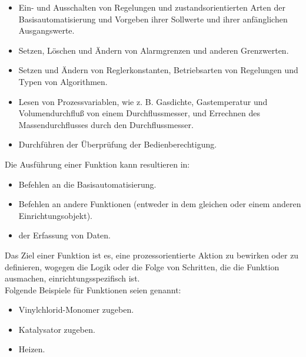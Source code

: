 \begin{itemize}
	\item Ein- und Ausschalten von Regelungen und zustandsorientierten Arten der Basisautomatisierung und Vorgeben ihrer Sollwerte und ihrer anfänglichen Ausgangswerte.
	\item Setzen, Löschen und Ändern von Alarmgrenzen und anderen Grenzwerten.
	\item Setzen und Ändern von Reglerkonstanten, Betriebsarten von Regelungen und Typen von Algorithmen.
	\item Lesen von Prozessvariablen, wie z. B. Gasdichte, Gastemperatur und Volumendurchfluß von einem Durchflussmesser, und Errechnen des Massendurchflusses durch den Durchflussmesser.
	\item Durchführen der Überprüfung der Bedienberechtigung.
\end{itemize}
Die Ausführung einer Funktion kann resultieren in:
\begin{itemize}
	\item Befehlen an die Basisautomatisierung.
	\item Befehlen an andere Funktionen (entweder in dem gleichen oder einem anderen Einrichtungsobjekt).
	\item der Erfassung von Daten.
\end{itemize}
Das Ziel einer Funktion ist es, eine prozessorientierte Aktion zu bewirken oder zu definieren, wogegen die Logik oder die Folge von Schritten, die die Funktion ausmachen, einrichtungsspezifisch ist.\\
Folgende Beispiele für Funktionen seien genannt:
\begin{itemize}
	\item Vinylchlorid-Monomer zugeben.
	\item Katalysator zugeben.
	\item Heizen.
\end{itemize}

